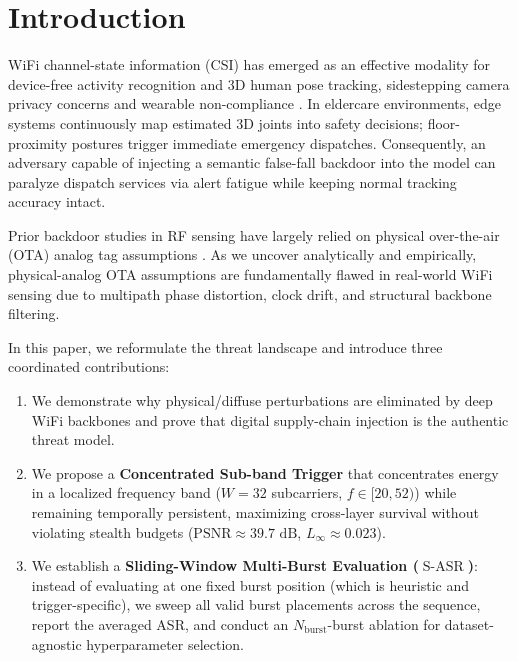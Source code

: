 \documentclass{article}
\newcommand{\SASR}{\operatorname{S-ASR}}
\newcommand{\Nb}{N_{\mathrm{burst}}}
\begin{document}
\section{Introduction}

WiFi channel-state information (CSI) has emerged as an effective modality for device-free
activity recognition and 3D human pose tracking, sidestepping camera privacy concerns and
wearable non-compliance \cite{ma2019wifi,jiang2020towards,yang2023mmfi}. In eldercare
environments, edge systems continuously map estimated 3D joints into safety decisions;
floor-proximity postures trigger immediate emergency dispatches. Consequently, an adversary
capable of injecting a semantic false-fall backdoor into the model can paralyze dispatch
services via alert fatigue while keeping normal tracking accuracy intact.

Prior backdoor studies in RF sensing have largely relied on physical over-the-air (OTA) analog
tag assumptions \cite{zhao2025rfbd}. As we uncover analytically and empirically, physical-analog
OTA assumptions are fundamentally flawed in real-world WiFi sensing due to multipath phase
distortion, clock drift, and structural backbone filtering.

In this paper, we reformulate the threat landscape and introduce three coordinated contributions:
\begin{enumerate}
    \item We demonstrate why physical/diffuse perturbations are eliminated by deep WiFi backbones
          and prove that digital supply-chain injection is the authentic threat model.
    \item We propose a \textbf{Concentrated Sub-band Trigger} that concentrates energy in a
          localized frequency band ($W=32$ subcarriers, $f \in [20,52)$) while remaining
          temporally persistent, maximizing cross-layer survival without violating stealth budgets
          ($\text{PSNR} \approx 39.7\text{~dB}$, $L_\infty \approx 0.023$).
    \item We establish a \textbf{Sliding-Window Multi-Burst Evaluation ($\SASR$)}: instead of
          evaluating at one fixed burst position (which is heuristic and trigger-specific), we
          sweep all valid burst placements across the sequence, report the averaged ASR, and
          conduct an $\Nb$-burst ablation for dataset-agnostic hyperparameter selection.
\end{enumerate}
\end{document}
